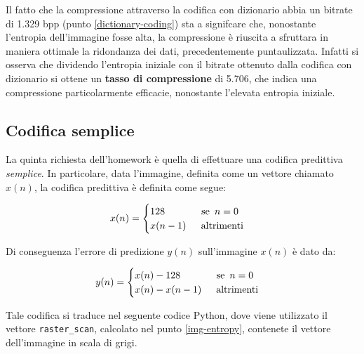 Il fatto che la compressione attraverso la codifica con dizionario abbia un bitrate di 1.329 bpp (punto \ref{dictionary-coding}) sta a signifcare che, nonostante l'entropia dell'immagine fosse alta, la compressione è riuscita a sfruttara in maniera ottimale la ridondanza dei dati, precedentemente puntaulizzata. Infatti si osserva che dividendo l'entropia iniziale con il bitrate ottenuto dalla codifica con dizionario si ottene un \textbf{tasso di compressione} di 5.706, che indica una compressione particolarmente efficacie, nonostante l'elevata entropia iniziale.



\vspace{15px}\subsection{Codifica semplice}\label{simple-coding}
La quinta richiesta dell'homework è quella di effettuare una codifica predittiva \textsl{semplice}. In particolare, data l'immagine, definita come un vettore chiamato $x(n)$, la codifica predittiva è definita come segue:

\begin{gather*}
    x(n) = 
    \begin{cases}
        128 \hspace{37px} \text{se } \, n = 0 \\
        x(n - 1) \hspace{15px} \text{altrimenti}\\
    \end{cases}
\end{gather*}

\noindent Di conseguenza l'errore di predizione $y(n)$ sull'immagine $x(n)$ è dato da:

\begin{gather*}
    y(n) = 
    \begin{cases}
        x(n) - 128 \hspace{37px} \text{se } \, n = 0 \\
        x(n) - x(n - 1) \hspace{15px} \text{altrimenti}\\
    \end{cases}
\end{gather*}

\noindent Tale codifica si traduce nel seguente codice Python, dove viene utilizzato il vettore \texttt{raster\_scan}, calcolato nel punto \ref{img-entropy}, contenete il vettore dell'immagine in scala di grigi.

